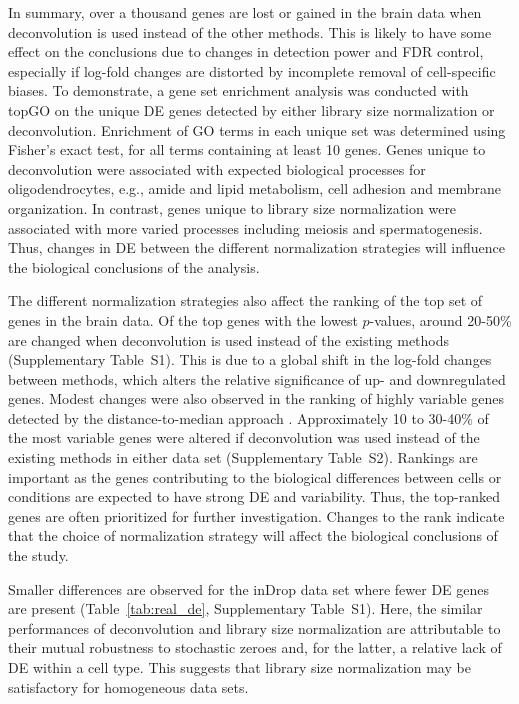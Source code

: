 \documentclass{bmcart}
\newcommand{\supprank}{S1}
\newcommand{\suppHVG}{S2}
\begin{document}
In summary, over a thousand genes are lost or gained in the brain data when deconvolution is used instead of the other methods.
This is likely to have some effect on the conclusions due to changes in detection power and FDR control, 
    especially if log-fold changes are distorted by incomplete removal of cell-specific biases.
To demonstrate, a gene set enrichment analysis was conducted with topGO \cite{alexa2010topgo} on the unique DE genes detected by either library size normalization or deconvolution.
Enrichment of GO terms in each unique set was determined using Fisher's exact test, for all terms containing at least 10 genes.
Genes unique to deconvolution were associated with expected biological processes for oligodendrocytes, e.g., amide and lipid metabolism, cell adhesion and membrane organization.
In contrast, genes unique to library size normalization were associated with more varied processes including meiosis and spermatogenesis.
Thus, changes in DE between the different normalization strategies will influence the biological conclusions of the analysis.

The different normalization strategies also affect the ranking of the top set of genes in the brain data.
Of the top genes with the lowest $p$-values, around 20-50\% are changed when deconvolution is used instead of the existing methods (Supplementary Table~\supprank{}).
This is due to a global shift in the log-fold changes between methods, which alters the relative significance of up- and downregulated genes.
Modest changes were also observed in the ranking of highly variable genes detected by the distance-to-median approach \cite{kolod2015single}.
Approximately 10 to 30-40\% of the most variable genes were altered if deconvolution was used instead of the existing methods in either data set (Supplementary Table~\suppHVG{}).
Rankings are important as the genes contributing to the biological differences between cells or conditions are expected to have strong DE and variability.
Thus, the top-ranked genes are often prioritized for further investigation.
Changes to the rank indicate that the choice of normalization strategy will affect the biological conclusions of the study.

Smaller differences are observed for the inDrop data set where fewer DE genes are present (Table~\ref{tab:real_de}, Supplementary Table~\supprank{}).
Here, the similar performances of deconvolution and library size normalization are attributable to their mutual robustness to stochastic zeroes and, for the latter, a relative lack of DE within a cell type.
This suggests that library size normalization may be satisfactory for homogeneous data sets.
\end{document}
